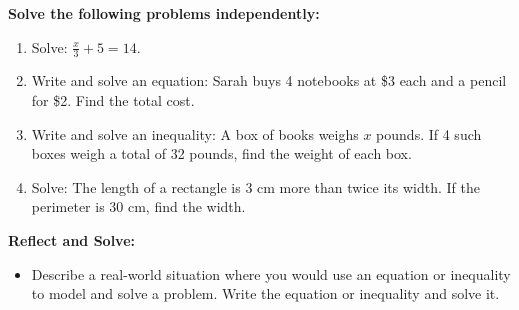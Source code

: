 \documentclass[12pt]{article}
\begin{document}
\begin{tcolorbox}[colframe=black!60, colback=white, 
coltitle=black, colbacktitle=black!15, fonttitle=\bfseries\Large, 
title=Independent Practice, halign title=center, left=10pt, right=10pt, top=10pt, bottom=15pt]
\textbf{Solve the following problems independently:}
\begin{enumerate}[itemsep=3em]
    \item Solve: \( \frac{x}{3} + 5 = 14 \).
    \item Write and solve an equation: Sarah buys 4 notebooks at \$3 each and a pencil for \$2. Find the total cost.
    \item Write and solve an inequality: A box of books weighs \( x \) pounds. If 4 such boxes weigh a total of 32 pounds, find the weight of each box.
    \item Solve: The length of a rectangle is 3 cm more than twice its width. If the perimeter is 30 cm, find the width.
\end{enumerate}
\end{tcolorbox}

\vspace{1em}

\begin{tcolorbox}[colframe=black!60, colback=white, 
coltitle=black, colbacktitle=black!15, fonttitle=\bfseries\Large, 
title=Exit Ticket, halign title=center, left=10pt, right=10pt, top=10pt, bottom=15pt]
\textbf{Reflect and Solve:}
\begin{itemize}
    \item Describe a real-world situation where you would use an equation or inequality to model and solve a problem. Write the equation or inequality and solve it.
\end{itemize}
\end{tcolorbox}
\end{document}
